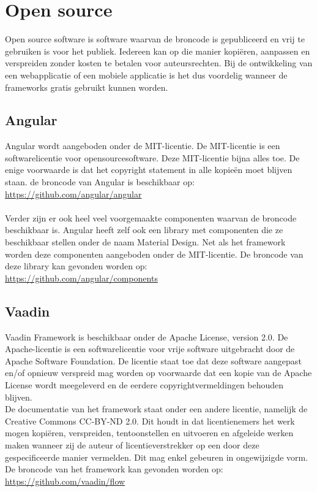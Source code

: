 \section{Open source}
Open source software is software waarvan de broncode is gepubliceerd en vrij te gebruiken is voor het publiek. Iedereen kan op die manier kopiëren, aanpassen en verspreiden zonder kosten te betalen voor auteursrechten.
Bij de ontwikkeling van een webapplicatie of een mobiele applicatie is het dus voordelig wanneer de frameworks gratis gebruikt kunnen worden. 

\subsection{Angular} \label{Open source Angular}
Angular wordt aangeboden onder de MIT-licentie.
De MIT-licentie is een softwarelicentie voor opensourcesoftware. Deze MIT-licentie bijna alles toe. De enige voorwaarde is dat het copyright statement in alle kopieën moet blijven staan.
de broncode van Angular is beschikbaar op: 
\\
\url{https://github.com/angular/angular} \\ \\
Verder zijn er ook heel veel voorgemaakte componenten waarvan de broncode beschikbaar is. Angular heeft zelf ook een library met componenten die ze beschikbaar stellen onder de naam Material Design. Net als het framework worden deze componenten aangeboden onder de MIT-licentie. De broncode van deze library kan gevonden worden op:
\\
\url{https://github.com/angular/components}

\subsection{Vaadin} \label{Open source Vaadin}
Vaadin Framework is beschikbaar onder de Apache License, version 2.0.
De Apache-licentie is een softwarelicentie voor vrije software uitgebracht door de Apache Software Foundation. De licentie staat toe dat deze software aangepast en/of opnieuw verspreid mag worden op voorwaarde dat een kopie van de Apache License wordt meegeleverd en de eerdere copyrightvermeldingen behouden blijven.
\\ De documentatie van het framework staat onder een andere licentie, namelijk de Creative Commons CC-BY-ND 2.0. Dit houdt in dat licentienemers  het werk mogen  kopiëren, verspreiden, tentoonstellen en uitvoeren en afgeleide werken maken wanneer zij de auteur of licentieverstrekker op een door deze gespecificeerde manier vermelden. Dit mag enkel gebeuren in ongewijzigde vorm.
\\De broncode van het framework kan gevonden worden op: 
\\ \url{https://github.com/vaadin/flow} \\ \\

